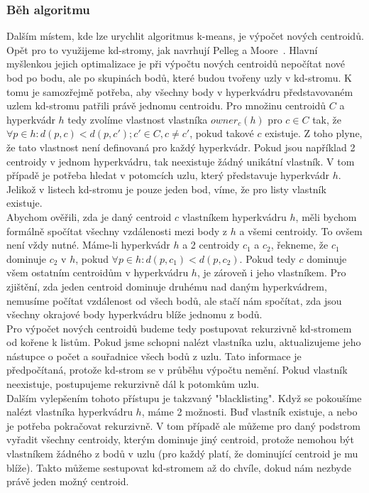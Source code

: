 \subsubsection{Běh algoritmu}
Dalším místem, kde lze urychlit algoritmus k-means, je výpočet nových centroidů. Opět pro to využijeme kd-stromy, jak navrhují Pelleg a Moore~\cite{pelleg99}. Hlavní myšlenkou jejich optimalizace je při výpočtu nových centroidů nepočítat nové bod po bodu, ale po skupinách bodů, které budou tvořeny uzly v kd-stromu. K tomu je samozřejmě potřeba, aby všechny body v hyperkvádru představovaném uzlem kd-stromu patřili právě jednomu centroidu. Pro množinu centroidů $C$ a hyperkvádr $h$ tedy zvolíme vlastnost vlastníka $owner_c(h)$ pro $c \in C$ tak, že $\forall p \in h: d(p,c) < d(p,c'); c' \in C, c \ne c'$, pokud takové $c$ existuje. Z toho plyne, že tato vlastnost není definovaná pro každý hyperkvádr. Pokud jsou například 2 centroidy v jednom hyperkvádru, tak neexistuje žádný unikátní vlastník. V tom případě je potřeba hledat v potomcích uzlu, který představuje hyperkvádr $h$. Jelikož v listech kd-stromu je pouze jeden bod, víme, že pro listy vlastník existuje.\\

Abychom ověřili, zda je daný centroid $c$ vlastníkem hyperkvádru $h$, měli bychom formálně spočítat všechny vzdálenosti mezi body z $h$ a všemi centroidy. To ovšem není vždy nutné. Máme-li hyperkvádr $h$ a 2 centroidy $c_1$ a $c_2$, řekneme, že $c_1$ dominuje $c_2$ v $h$, pokud $\forall p \in h: d(p,c_1) < d(p,c_2)$. Pokud tedy $c$ dominuje všem ostatním centroidům v hyperkvádru $h$, je zároveň i jeho vlastníkem. Pro zjištění, zda jeden centroid dominuje druhému nad daným hyperkvádrem, nemusíme počítat vzdálenost od všech bodů, ale stačí nám spočítat, zda jsou všechny okrajové body hyperkvádru blíže jednomu z bodů.\\

Pro výpočet nových centroidů budeme tedy postupovat rekurzivně kd-stromem od kořene k listům. Pokud jsme schopni nalézt vlastníka uzlu, aktualizujeme jeho nástupce o počet a souřadnice všech bodů z uzlu. Tato informace je předpočítaná, protože kd-strom se v průběhu výpočtu nemění. Pokud vlastník neexistuje, postupujeme rekurzivně dál k potomkům uzlu.\\

Dalším vylepšením tohoto přístupu je takzvaný "blacklisting". Když se pokoušíme nalézt vlastníka hyperkvádru $h$, máme 2 možnosti. Buď vlastník existuje, a nebo je potřeba pokračovat rekurzivně. V tom případě ale můžeme pro daný podstrom vyřadit všechny centroidy, kterým dominuje jiný centroid, protože nemohou být vlastníkem žádného z bodů v uzlu (pro každý platí, že dominující centroid je mu blíže). Takto můžeme sestupovat kd-stromem až do chvíle, dokud nám nezbyde právě jeden možný centroid.\\

